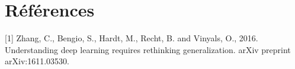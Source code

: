 \documentclass[a4paper,english,12pt, twocolumn]{article}
\makeatletter
\newcommand{\emptypage}[1]{
  \cleardoublepage
  \begingroup
  \let\ps@plain\ps@empty
  \pagestyle{empty}
  #1
  \cleardoublepage
  \endgroup}
\makeatother
\begin{document}
\section*{Références}
[1] Zhang, C., Bengio, S., Hardt, M., Recht, B. and Vinyals, O., 2016. Understanding deep learning requires rethinking generalization. arXiv preprint arXiv:1611.03530.

%
%
\end{document}
